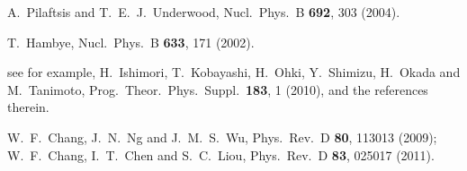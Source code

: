 \documentclass[aps,prd,preprint,nofootinbib]{revtex4}
\begin{document}
\begin{thebibliography}{99}
  A.~Pilaftsis and T.~E.~J.~Underwood,
  Nucl.\ Phys.\  B {\bf 692}, 303 (2004).

  T.~Hambye,
  Nucl.\ Phys.\  B {\bf 633}, 171 (2002).

see for example,
  H.~Ishimori, T.~Kobayashi, H.~Ohki, Y.~Shimizu, H.~Okada and M.~Tanimoto,
  Prog.\ Theor.\ Phys.\ Suppl.\  {\bf 183}, 1 (2010),
  and the references therein.

  W.~F.~Chang, J.~N.~Ng and J.~M.~S.~Wu,
  Phys.\ Rev.\  D {\bf 80}, 113013 (2009);
  W.~F.~Chang, I.~T.~Chen and S.~C.~Liou,
  Phys.\ Rev.\  D {\bf 83}, 025017 (2011).



\end{thebibliography}
\end{document}
